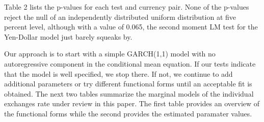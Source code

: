 \documentclass[12pt]{article}
\begin{document}
Table 2 lists the p-values for each test and currency pair. None of the p-values reject the null of an independently distributed uniform distribution at five percent level, although with a value of 0.065, the second moment LM test for the Yen-Dollar model just barely squeaks by.


Our approach is to start with a simple GARCH(1,1) model with no autoregressive component in the conditional mean equation. If our tests indicate that the model is well specified, we stop there. If not, we continue to add additional parameters or try different functional forms until an acceptable fit is obtained. The next two tables summarize the marginal models of the individual exchanges rate under review in this paper. The first table provides an overview of the functional forms while the second provides the estimated paramater values.

\vspace{10mm}
\end{document}
